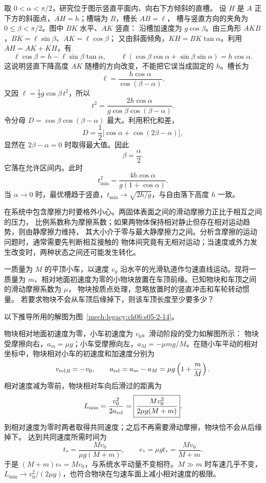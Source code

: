 {\begin{xesolution}
取 $0<\alpha<\pi/2$，研究位于图示竖直平面内、向右下方倾斜的直槽。
设 $H$ 是 $A$ 正下方的斜面点，$AH=h$；槽端为 $B$，槽长 $AB=\ell$，
槽与竖直方向的夹角为 $0\le\beta<\pi/2$。图中 $BK$ 水平、$AK$ 竖直：
\soldiagTwoThirteen
沿槽加速度为 $g\cos\beta$。由三角形 $AKB$，$BK=\ell\sin\beta$、$AK=\ell\cos\beta$；
又由斜面倾角，$KH=BK\tan\alpha$。利用 $AH=AK+KH$，有
\[
 \ell\cos\beta=h-\ell\sin\beta\tan\alpha,
 \qquad \ell(\cos\beta\cos\alpha+\sin\beta\sin\alpha)=h\cos\alpha.
\]
这说明竖直下降高度 $AK$ 随槽的方向改变，不能把它误当成固定的 $h$。槽长为
\[
 \ell=\frac{h\cos\alpha}{\cos(\beta-\alpha)}.
\]
又因 $\ell=\tfrac12g\cos\beta\,t^2$，所以
\[
 t^2=\frac{2h\cos\alpha}
 {g\cos\beta\cos(\beta-\alpha)}.
\]
令分母
$D=\cos\beta\cos(\beta-\alpha)$ 最大。利用积化和差，
\[
 D=\frac12\bigl[\cos\alpha+\cos(2\beta-\alpha)\bigr],
\]
显然在 $2\beta-\alpha=0$ 时取得最大值。因此
\[
  \boxed{\beta=\frac\alpha2}.
\]
它落在允许区间内。此时
\[
 t_{\min}^2=\frac{4h\cos\alpha}{g(1+\cos\alpha)}.
\]
当 $\alpha\to0$ 时，最优槽趋于竖直，$t_{\min}\to\sqrt{2h/g}$，与自由落下高度 $h$ 一致。
\end{xesolution}

在系统中包含摩擦力时要格外小心。两固体表面之间的滑动摩擦力正比于相互之间的压力，
比例系数称为摩擦系数；如果两物体保持相对静止但存在相对运动趋势，则由静摩擦力维持，
其大小介于零与最大静摩擦力之间。分析含摩擦的运动问题时，通常需要先判断相互接触的
物体间究竟有无相对运动；当速度或外力发生改变时，两种状态之间还可能发生转化。

\begin{origexamplebox}{}\label{ch06:ex:s05-2-14}
一质量为 $M$ 的平顶小车，以速度 $v_0$ 沿水平的光滑轨道作匀速直线运动。现将一质量为
$m$、相对地面初速度为零的小物块放置在车顶前缘。已知物块和车顶之间的滑动摩擦系数为 $\mu$，
物块按质点处理，忽略放置时的竖直冲击和车轮转动惯量。
若要求物块不会从车顶后缘掉下，则该车顶长度至少要多少？
\probdiagTwoFourteen
\end{origexamplebox}

\begin{xesolution}
以下推导所用的解图为图~\ref{mech:legacy:ch06:s05-2-14}。

物块相对地面初速度为零，小车初速度为 $v_0$。滑动阶段的受力如解图所示：
\soldiagTwoFourteen
物块受摩擦向右，$a_m=\mu g$；小车受摩擦向左，$a_M=-\mu mg/M$。在随小车平动的相对
坐标中，物块相对小车的初速度和加速度分别为
\[
 v_{\rm rel,0}=-v_0,
 \qquad
 a_{\rm rel}=a_m-a_M=\mu g\left(1+\frac mM\right).
\]
相对速度减为零前，物块相对车向后滑过的距离为
\[
 L_{\min}=\frac{v_0^2}{2a_{\rm rel}}
 =\boxed{\frac{Mv_0^2}{2\mu g(M+m)}}.
\]
到相对速度为零时两者取得共同速度；之后不再需要滑动摩擦，物块恰不会从后缘掉下。
达到共同速度所需时间为
\[
 t_* =\frac{Mv_0}{\mu g(M+m)},\qquad
 v_*=\mu g t_* =\frac{Mv_0}{M+m}.
\]
于是 $(M+m)v_*=Mv_0$，与系统水平动量不变相符。$M\gg m$ 时车速几乎不变，
$L_{\min}\to v_0^2/(2\mu g)$，也符合物块在匀速车面上减小相对速度的极限。
\end{xesolution}

}
